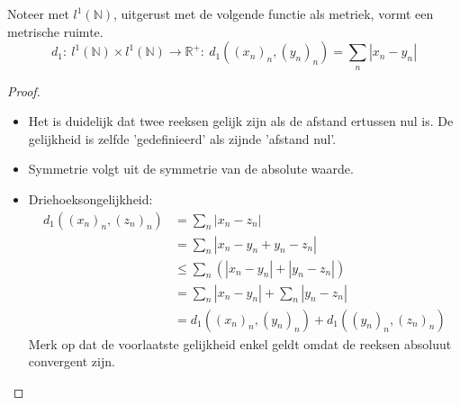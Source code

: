 \documentclass[main.tex]{subfiles}
\begin{document}
\begin{vb}
  Noteer met $l^{1}(\mathbb{N})$, uitgerust met de volgende functie als metriek, vormt een metrische ruimte.
  \[ d_{1}:\ l^{1}(\mathbb{N}) \times l^{1}(\mathbb{N}) \rightarrow \mathbb{R}^{+}:\ d_{1}((x_{n})_{n},(y_{n})_{n}) = \sum_{n}|x_{n}-y_{n}| \]

  \begin{proof}
    \noindent
    \begin{itemize}
    \item Het is duidelijk dat twee reeksen gelijk zijn als de afstand ertussen nul is.
      De gelijkheid is zelfde 'gedefinieerd' als zijnde 'afstand nul'.
    \item Symmetrie volgt uit de symmetrie van de absolute waarde.
    \item Driehoeksongelijkheid:
      \begin{align*}
        d_{1}((x_{n})_{n},(z_{n})_{n})
        &= \sum_{n}|x_{n}-z_{n}|\\
        &= \sum_{n}|x_{n}-y_{n}+y_{n}-z_{n}|\\
        &\le \sum_{n}\left(|x_{n}-y_{n}|+|y_{n}-z_{n}|\right)\\
        &= \sum_{n}|x_{n}-y_{n}|+\sum_{n}|y_{n}-z_{n}|\\
        &=d_{1}((x_{n})_{n},(y_{n})_{n})+d_{1}((y_{n})_{n},(z_{n})_{n})
      \end{align*}
      Merk op dat de voorlaatste gelijkheid enkel geldt omdat de reeksen absoluut convergent zijn.
    \end{itemize}
  \end{proof}
\end{vb}
\end{document}
